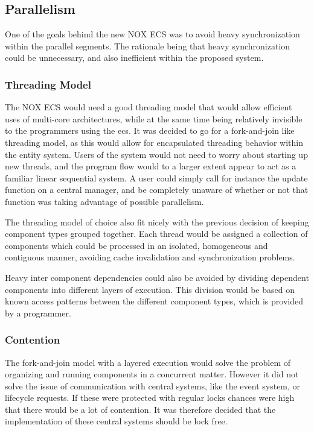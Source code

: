 \subsection{Parallelism}
One of the goals behind the new NOX ECS was to avoid heavy synchronization within the parallel segments.
The rationale being that heavy synchronization could be unnecessary, and also inefficient within the proposed system.

\subsubsection{Threading Model}
\label{subsubsec:high_level_threading_model}
The NOX ECS would need a good threading model that would allow efficient uses of multi-core
architectures, while at the same time being relatively invisible to the programmers
using the ecs.
It was decided to go for a fork-and-join like threading model\cite[p. 369]{game_engine_architecture},
as this would allow for encapsulated threading behavior within the entity system.
Users of the system would not need to worry about starting up new threads,
and the program flow would to a larger extent appear to act as a familiar linear sequential system.
A user could simply call for instance the update function on a central manager, and be completely
unaware of whether or not that function was taking advantage of possible parallelism.


The threading model of choice also fit nicely with the previous decision of keeping component types
grouped together.
Each thread would be assigned a collection of components which could be processed in an isolated,
homogeneous and contiguous manner, avoiding cache invalidation and synchronization problems.

Heavy inter component dependencies could also be avoided by dividing dependent components
into different layers of execution.
This division would be based on known access patterns between the different component types,
which is provided by a programmer.

\subsubsection{Contention}
The fork-and-join model with a layered execution would solve the problem of organizing and running components
in a concurrent matter. However it did not solve the issue of communication with central systems, like the event system, or lifecycle requests.
If these were protected with regular locks chances were high that there would be a lot of contention.
It was therefore decided that the implementation of these central systems should be lock free.

